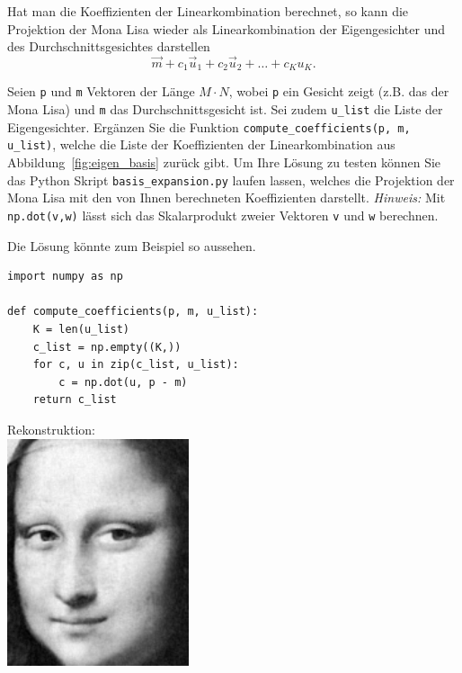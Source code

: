 Hat man die Koeffizienten der Linearkombination berechnet, so kann die Projektion der Mona Lisa wieder als Linearkombination der Eigengesichter und des Durchschnittsgesichtes darstellen
\begin{equation*}
	\vec m+c_1\vec u_1+c_2\vec u_2+\ldots+c_Ku_K.
\end{equation*}
\begin{aufgabe} \label{aufg:compute_coefficients}
	Seien \texttt{p} und \texttt{m} Vektoren der Länge $M\cdot N$, wobei \texttt{p} ein Gesicht zeigt (z.B. das der Mona Lisa) und \texttt{m} das Durchschnittsgesicht ist.
	Sei zudem \texttt{u\_list} die Liste der Eigengesichter.
	Ergänzen Sie die Funktion \texttt{compute\_coefficients(p, m, u\_list)}, welche die Liste der Koeffizienten der Linearkombination aus Abbildung~\ref{fig:eigen_basis} zurück gibt.
	Um Ihre Lösung zu testen können Sie das Python Skript \texttt{basis\_expansion.py} laufen lassen, welches die Projektion der Mona Lisa mit den von Ihnen berechneten Koeffizienten darstellt.
	\textit{Hinweis:} Mit \texttt{np.dot(v,w)} lässt sich das Skalarprodukt zweier Vektoren \texttt{v} und \texttt{w} berechnen.
\end{aufgabe}
\begin{losung}
	Die Lösung könnte zum Beispiel so aussehen.\\[0.5cm]
	\begin{minipage}{0.65\textwidth}
\begin{lstlisting}[style=python]
import numpy as np

def compute_coefficients(p, m, u_list):
	K = len(u_list)
	c_list = np.empty((K,))
	for c, u in zip(c_list, u_list):
		c = np.dot(u, p - m)
	return c_list
\end{lstlisting}
	\end{minipage}\hfill
	\begin{minipage}{0.35\textwidth}\vspace{-1cm}
		\centering Rekonstruktion:\\[0.5cm]
		\includegraphics[width=0.4\textwidth]{images/eigenfaces/mona_lisa_eigen_approx}
	\end{minipage}
\end{losung}

